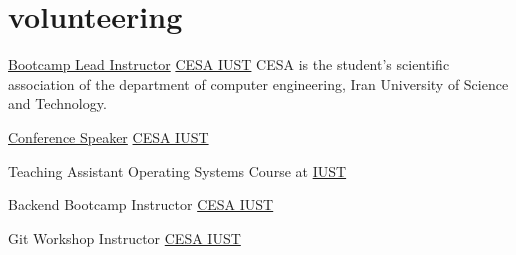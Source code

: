 \documentclass[a4paper]{article}
\begin{document}
\begin{minipage}[t]{0.3\textwidth}
  \section{volunteering}
  {

     \volunteer
     {\href{https://www.linkedin.com/posts/cesa-iust_قراره-با-هم-دنیای-وب-رو-زیر-و-رو-کنیم-activity-7221917118215180288-SRca/?rcm=ACoAACBgw1ABKvTqrlXwvAbFBul6vPHXEMeIFWw}{Bootcamp Lead Instructor}}
      {\href{https://www.linkedin.com/company/cesa-iust/}{CESA IUST}}
      {CESA is the student's scientific association of the department of computer engineering, Iran University of Science and Technology.}
    
      \vspace*{6pt}

     \volunteer
      {\href{https://www.linkedin.com/posts/sina-shabaniku_techroad-activity-7201269217688436736-C0G2?utm_source=share&utm_medium=member_desktop&rcm=ACoAACBgw1ABKvTqrlXwvAbFBul6vPHXEMeIFWw}{Conference Speaker}}
      {\href{https://www.linkedin.com/company/cesa-iust/}{CESA IUST}}
      {}

    \vspace*{6pt}

    \volunteer
      {Teaching Assistant}
      {Operating Systems Course at \href{https://www.linkedin.com/school/iran-university-of-science-and-technology/}{IUST}}
      {}

    \vspace*{6pt}

    \volunteer
      {Backend Bootcamp Instructor}
      {\href{https://www.linkedin.com/company/cesa-iust/}{CESA IUST}}
      {}

    \vspace*{6pt}

    \volunteer
      {Git Workshop Instructor}
      {\href{https://www.linkedin.com/company/cesa-iust/}{CESA IUST}}
      {}
  }
\end{minipage}
\hspace{20pt}
\end{document}
